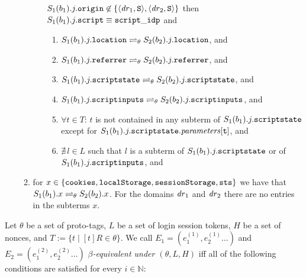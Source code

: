 \begin{theorem}
\begin{definition}
\begin{enumerate}
\begin{enumerate}
\begin{enumerate}
          $S_1(b_1).j.\mathtt{origin} \not\in
          \{\langle\mathit{dr}_1,\mathtt{S}\rangle,\langle\mathit{dr}_2,\mathtt{S}\rangle\}$
          then $S_1(b_1).j.\mathtt{script} \equiv \mathtt{script\_idp}$ and \
          \begin{enumerate}
          \item
            $S_1(b_1).j.\mathtt{location} \rightleftharpoons_{\theta}
            S_2(b_2).j.\mathtt{location}$, and
          \item
            $S_1(b_1).j.\mathtt{referrer} \rightleftharpoons_{\theta}
            S_2(b_2).j.\mathtt{referrer}$, and
          \item\label{eqs:b:w:att_script:state}
            $S_1(b_1).j.\mathtt{scriptstate} \rightleftharpoons_{\theta}
            S_2(b_2).j.\mathtt{scriptstate}$, and
          \item
            $S_1(b_1).j.\mathtt{scriptinputs} \rightleftharpoons_{\theta}
            S_2(b_2).j.\mathtt{scriptinputs}$, and
          \item\label{eqs:b:w:att_script:t}
            $\forall t \in T$: $t$ is not contained in any subterm of 
            $S_1(b_1).j.\mathtt{scriptstate}$ except for 
            $S_1(b_1).j.\mathtt{scriptstate}.\mathit{parameters}[\mathtt{t}]$, and
          \item $\nexists\, l \in L$ such that $l$ is a subterm of
            $S_1(b_1).j.\mathtt{scriptstate}$ or of
            $S_1(b_1).j.\mathtt{scriptinputs}$, and
          \end{enumerate}
        \end{enumerate}
      \item\label{eqs:b:misc} for
        $x \in \{\mathtt{cookies},\mathtt{localStorage},\mathtt{sessionStorage},\mathtt{sts}\}$
        we have that $S_1(b_1).x \rightleftharpoons_{\theta} S_2(b_2).x$. For the
        domains $\mathit{dr}_1$ and $\mathit{dr}_2$ there are no entries in the
        subterms $x$.
      \end{enumerate}
    \end{enumerate}
  \end{definition}
  
  \begin{definition}\label{def:Events}
    Let $\theta$ be a set of proto-tags, 
    $L$ be a set of login session tokens, 
    $H$ be a set of nonces, and
    $T:=\{t\mid [t]R\in \theta\}$. 
    We call $E_1 = (e_1^{(1)}, e_2^{(1)}\dots)$ and
    $E_2= (e_1^{(2)}, e_2^{(2)} \dots)$ 
    \emph{$\beta$-equivalent under $(\theta, L, H)$} 
    iff all of the following conditions are satisfied for every 
    $i \in \mathbb{N}$:
  

\end{definition}
\end{theorem}
